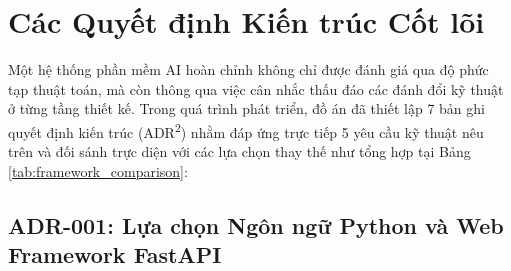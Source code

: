 \section{Các Quyết định Kiến trúc Cốt lõi}
\label{sec:arch_adrs}

Một hệ thống phần mềm AI hoàn chỉnh không chỉ được đánh giá qua độ phức tạp thuật toán, mà còn thông qua việc cân nhắc thấu đáo các đánh đổi kỹ thuật ở từng tầng thiết kế. Trong quá trình phát triển, đồ án đã thiết lập 7 bản ghi quyết định kiến trúc (ADR\textsuperscript{2}) nhằm đáp ứng trực tiếp 5 yêu cầu kỹ thuật nêu trên và đối sánh trực diện với các lựa chọn thay thế như tổng hợp tại Bảng \ref{tab:framework_comparison}:

\subsection{ADR-001: Lựa chọn Ngôn ngữ Python và Web Framework FastAPI}
